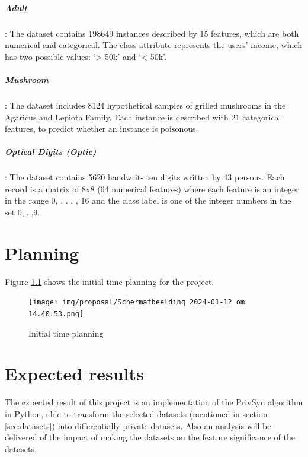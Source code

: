 \documentclass[a4paper,10pt,titlepage]{report}
\begin{document}
\paragraph{Adult}: The dataset contains 198649 instances described by 15 features, which are both numerical and categorical. The class attribute represents the users’ income, which has two possible values: ‘> 50k’ and ‘< 50k’.
\paragraph{Mushroom}: The dataset includes 8124 hypothetical samples of grilled mushrooms in the Agaricus and Lepiota Family. Each instance is described with 21 categorical features, to predict whether an instance is poisonous.
\paragraph{Optical Digits (Optic)}: The dataset contains 5620 handwrit- ten digits written by 43 persons. Each record is a matrix of 8x8 (64 numerical features) where each feature is an integer in the range {0, . . . , 16} and the class label is one of the integer numbers in the set {0,...,9}.

\chapter{Planning}
Figure \ref{fig:initialplanning} shows the initial time planning for the project.
\begin{figure}[H]
    \centering
    \texttt{[image: img/proposal/Scherm­afbeelding 2024-01-12 om 14.40.53.png]}
    \caption{Initial time planning}
    \label{fig:initialplanning}
\end{figure}

\chapter{Expected results}
The expected result of this project is an implementation of the PrivSyn \cite{privsyn} algorithm in Python, able to transform the selected datasets (mentioned in section \ref{sec:datasets}) into differentially private datasets. Also an analysis will be delivered of the impact of making the datasets on the feature significance of the datasets.

% 
% 
% 
% 
% 
% 

\printbibliography[heading=bibintoc]
\printglossaries%

% 

\end{document}
